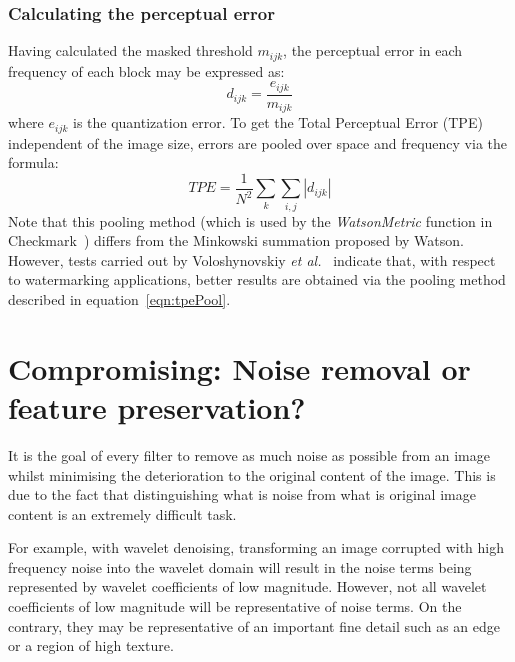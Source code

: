 \documentclass[12pt]{report}
\begin{document}
\subsubsection{Calculating the perceptual error}
Having calculated the masked threshold $m_{ijk}$, the perceptual error in each
frequency of each block may be expressed as:
\begin{equation}
d_{ijk}=\frac{e_{ijk}}{m_{ijk}}
\end{equation}
where $e_{ijk}$ is the quantization error. To get the Total Perceptual Error (TPE) independent
of the image size, errors are pooled over space and frequency via the formula:
\begin{equation}
\label{eqn:tpePool}
TPE = \frac{1}{N^{2}} \sum_{k} \sum_{i,j} \left|d_{ijk}\right|
\end{equation}
Note that this pooling method (which is used by the \emph{WatsonMetric} function in
Checkmark~\cite{checkmark}) differs
from the Minkowski summation proposed by Watson. However, tests carried out by
Voloshynovskiy \emph{et al.}~\cite{volo2nd} indicate that, with 
respect to watermarking applications, better
results are obtained via the pooling method described in equation~\ref{eqn:tpePool}.
 

\section{Compromising: Noise removal or feature preservation?}
\label{comprimise}
It is the goal of every filter to remove as much noise as possible from 
an image whilst minimising the deterioration to the original content of 
the image. This is due to the fact that distinguishing what is noise from 
what is original image content is an extremely difficult task. 

For example,
with wavelet denoising, transforming an image corrupted with high frequency 
noise into the wavelet domain will result in the noise terms being represented 
by wavelet coefficients of low magnitude. 
However, not all wavelet coefficients of low magnitude will be representative
of noise terms. On the contrary, they may be representative of an important
fine detail such as an edge or a region of high texture.  
\end{document}
